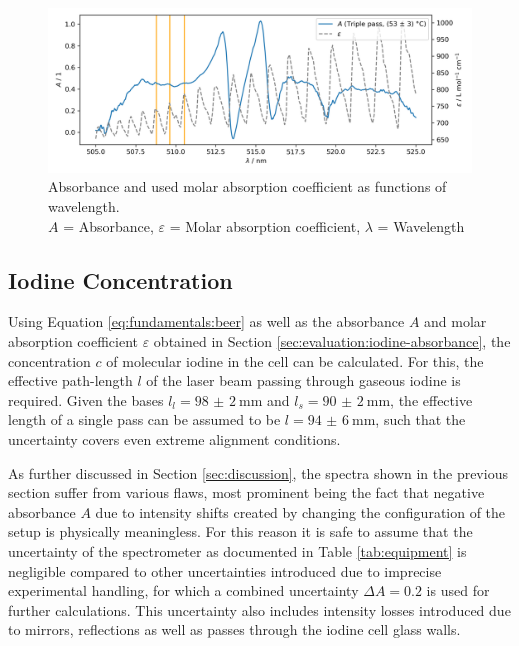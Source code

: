 \begin{figure}[H]
    \centering
    \includegraphics[width=\textwidth]{graphics/absorbance-triple.png}
    \caption{Absorbance and used molar absorption coefficient as functions of wavelength.\\
        $A$ = Absorbance, $\varepsilon$ = Molar absorption coefficient, $\lambda$ = Wavelength}
    \label{fig:evaluation:absorbance:triple}
\end{figure}

\subsection{Iodine Concentration}
\label{sec:evaluation:iodine-concentration}

Using Equation \ref{eq:fundamentals:beer} as well as the absorbance $A$ and molar absorption coefficient $\varepsilon$ obtained in Section \ref{sec:evaluation:iodine-absorbance}, the concentration $c$ of molecular iodine in the cell can be calculated.
For this, the effective path-length $l$ of the laser beam passing through gaseous iodine is required. Given the bases $l_l = \SI{98(2)}{\mm}$ and $l_s = \SI{90(2)}{\mm}$, the effective length of a single pass can be assumed to be $l = \SI{94(6)}{\mm}$, such that the uncertainty covers even extreme alignment conditions.

As further discussed in Section \ref{sec:discussion}, the spectra shown in the previous section suffer from various flaws, most prominent being the fact that negative absorbance $A$ due to intensity shifts created by changing the configuration of the setup is physically meaningless. For this reason it is safe to assume that the uncertainty of the spectrometer as documented in Table \ref{tab:equipment} is negligible compared to other uncertainties introduced due to imprecise experimental handling, for which a combined uncertainty $\Delta A = 0.2$ is used for further calculations. This uncertainty also includes intensity losses introduced due to mirrors, reflections as well as passes through the iodine cell glass walls.

